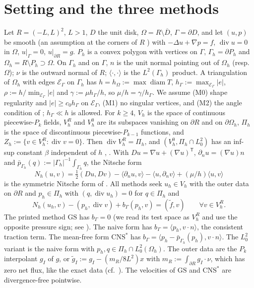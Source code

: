 \documentclass[5p,times]{elsarticle}
\theoremstyle{definition}
\newcommand{\hG}{h_\Gamma}
\newcommand{\hO}{h_\Omega}
\newcommand{\Gh}{\Gamma_h}
\newcommand{\Oh}{\Omega_h}
\newcommand{\EG}{\mathcal E_\Gamma}
\newcommand{\Vh}{V_h}
\newcommand{\VR}{V_h^R}
\newcommand{\VO}{V_h^0}
\newcommand{\Pih}{\Pi_h}
\newcommand{\Zh}{Z_h}
\newcommand{\gI}{g_I}
\newcommand{\dn}{\partial_n}
\newcommand{\ft}{\tilde f}
\newcommand{\pbG}{\bar p_{\Gamma_h}}
\newcommand{\ip}[2]{\langle #1,#2\rangle}
\newcommand{\GS}{\mathrm{GS}}
\newcommand{\CNS}{\mathrm{CNS}^\ast}
\renewcommand{\div}{\operatorname{div}}
\newcommand{\ext}[1]{\cite[#1]{PadhiExt}}
\begin{document}
\section{Setting and the three methods}\label{sec:setting}

Let $R=(-L,L)^2$, $L>1$, $D$ the unit disk, $\Omega=R\setminus\overline D$, $\Gamma=\partial D$, and let $(u,p)$ be smooth (an assumption at the corners of $R$ \ext{Rem.~2.5}) with $-\Delta u+\nabla p=f$, $\div u=0$ in $\Omega$, $u|_\Gamma=0$, $u|_{\partial R}=g$. $P_h$ is a convex polygon with vertices on $\Gamma$, $\Gh=\partial P_h$ and $\Oh=R\setminus P_h\supset\Omega$. On $\Gh$ and on $\Gamma$, $n$ is the unit normal pointing out of $\Oh$ (resp.\ $\Omega$); $\nu$ is the outward normal of $R$; $\ip\cdot\cdot$ is the $L^2(\Gh)$ product. A triangulation of $\Oh$ with edges $\EG$ on $\Gh$ has
$h=\hO:=\max\operatorname{diam}T$, $\hG:=\max_{\EG}|e|$, $\rho:=h/\min_{\EG}|e|$ and $\gamma:=\mu\hG/h$, so $\mu/h=\gamma/\hG$.
We assume (M0) shape regularity and $|e|\ge c_0\hG$ on $\EG$, (M1) no singular vertices, and (M2) the angle condition of \cite[Thm.~1]{GuzmanScott2019}; $\hG\ll h$ is allowed. For $k\ge4$, $\Vh$ is the space of continuous piecewise-$P_k$ fields, $\VR$ and $\VO$ are its subspaces vanishing on $\partial R$ and on $\partial\Oh$, $\Pih$ is the space of discontinuous piecewise-$P_{k-1}$ functions, and $\Zh:=\{v\in\VR:\div v=0\}$. Then $\div\VR=\Pih$, and $(\VO,\Pih\cap L^2_0)$ has an inf-sup constant $\beta$ independent of $h$ \cite{GuzmanScott2019}, \ext{Lemmas~4.3, 4.5}. With $Du=\nabla u+(\nabla u)^{\mathsf T}$, $\dn u=(\nabla u)n$ and $\pbG(q):=|\Gh|^{-1}\int_{\Gh}q$, the Nitsche form
\[
N_h(u,v)=\tfrac12(Du,Dv)-\ip{\dn u}{v}-\ip{u}{\dn v}+(\mu/h)\ip uv
\]
is the symmetric Nitsche form of \cite{GjerdeScott2024}. All methods seek $u_h\in\Vh$ with the outer data on $\partial R$ and $p_h\in\Pih$ with $(q,\div u_h)=0$ for $q\in\Pih$ and
\begin{equation}\label{eq:methods}
N_h(u_h,v)-(p_h,\div v)+b_\Gamma(p_h,v)=(\ft,v)\qquad\forall v\in\VR .
\end{equation}
The printed method $\GS$ \cite[(28)]{GjerdeScott2024} has $b_\Gamma=0$ (we read its test space as $\VR$ and use the opposite pressure sign; see \ext{\S2}). The naive form has $b_\Gamma=\ip{p_h}{v\cdot n}$, the consistent traction term. The mean-free form $\CNS$ has $b_\Gamma=\ip{p_h-\pbG(p_h)}{v\cdot n}$. The $L^2_0$ variant is the naive form with $p_h,q\in\Pih\cap L^2_0(\Oh)$. The outer data are the $P_k$ interpolant $\gI$ of $g$, or $\tilde g_I:=\gI-(m_R/8L^2)x$ with $m_R:=\int_{\partial R}\gI\cdot\nu$, which has zero net flux, like the exact data (cf.\ \cite{EickmannScottTscherpel2025}). The velocities of $\GS$ and $\CNS$ are divergence-free pointwise.
\end{document}
